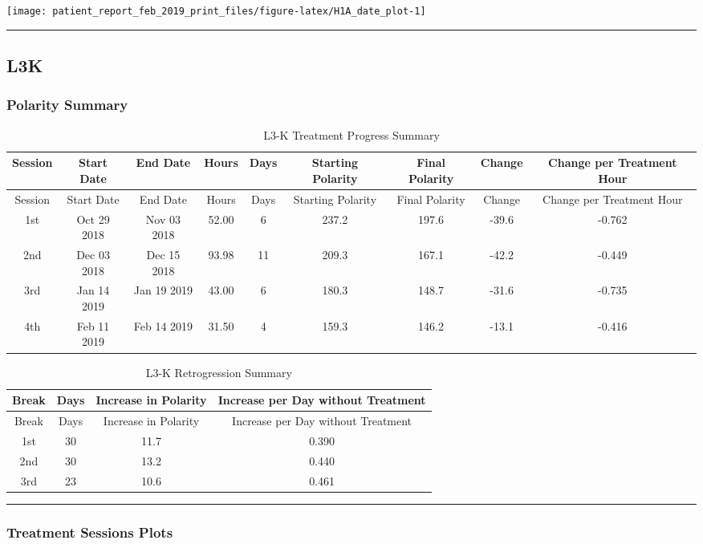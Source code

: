 \documentclass[]{article}
\begin{document}
\texttt{[image: patient\_report\_feb\_2019\_print\_files/figure-latex/H1A\_date\_plot-1]}

\begin{center}\rule{0.5\linewidth}{\linethickness}\end{center}

\subsection{L3K}\label{l3k}

\subsubsection{Polarity Summary}\label{polarity-summary-4}

\begin{longtable}[]{@{}ccccccccc@{}}
\caption{L3-K Treatment Progress Summary}\tabularnewline
\toprule
Session & Start Date & End Date & Hours & Days & Starting Polarity &
Final Polarity & Change & Change per Treatment Hour\tabularnewline
\midrule
\endfirsthead
\toprule
Session & Start Date & End Date & Hours & Days & Starting Polarity &
Final Polarity & Change & Change per Treatment Hour\tabularnewline
\midrule
\endhead
1st & Oct 29 2018 & Nov 03 2018 & 52.00 & 6 & 237.2 & 197.6 & -39.6 &
-0.762\tabularnewline
2nd & Dec 03 2018 & Dec 15 2018 & 93.98 & 11 & 209.3 & 167.1 & -42.2 &
-0.449\tabularnewline
3rd & Jan 14 2019 & Jan 19 2019 & 43.00 & 6 & 180.3 & 148.7 & -31.6 &
-0.735\tabularnewline
4th & Feb 11 2019 & Feb 14 2019 & 31.50 & 4 & 159.3 & 146.2 & -13.1 &
-0.416\tabularnewline
\bottomrule
\end{longtable}

\begin{longtable}[]{@{}cccc@{}}
\caption{L3-K Retrogression Summary}\tabularnewline
\toprule
Break & Days & Increase in Polarity & Increase per Day without
Treatment\tabularnewline
\midrule
\endfirsthead
\toprule
Break & Days & Increase in Polarity & Increase per Day without
Treatment\tabularnewline
\midrule
\endhead
1st & 30 & 11.7 & 0.390\tabularnewline
2nd & 30 & 13.2 & 0.440\tabularnewline
3rd & 23 & 10.6 & 0.461\tabularnewline
\bottomrule
\end{longtable}

\begin{center}\rule{0.5\linewidth}{\linethickness}\end{center}

\subsubsection{Treatment Sessions
Plots}\label{treatment-sessions-plots-4}
\end{document}
